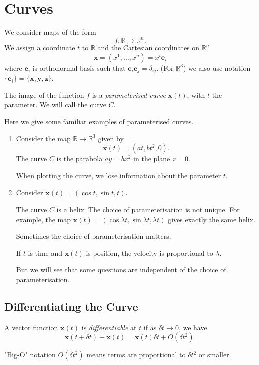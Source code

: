 \section{Curves}
We consider maps of the form
\[
    f:\mathbb{R}\to \mathbb{R}^n.
\]
We assign a coordinate \(t\) to \(\mathbb{R}\) and the Cartesian coordinates on \(\mathbb{R}^n\)
\[
    \mathbf{x} = (x^1, \ldots, x^n ) = x^i \mathbf{e}_i
\]
where \(\mathbf{e} _i\) is orthonormal basis such that \(\mathbf{e} _i \mathbf{e} _j = \delta_{ij}\). (For \(\mathbb{R}^3\)) we also use notation \(\{\mathbf{e} _i\} = \{\mathbf{x} ,\mathbf{y} ,\mathbf{z} \}\).

The image of the function \(f\) is a \textit{parameterised curve} \(\mathbf{x} (t)\), with \(t\) the parameter. We will call the curve \(C\).

\begin{eg}
    Here we give some familiar examples of parameterised curves.
    \begin{enumerate}
        \item Consider the map \(\mathbb{R}\to\mathbb{R}^3\) given by
        \[
            \mathbf{x} (t) = (at, bt^2, 0).
        \]
        The curve \(C\) is the parabola \(ay = bx^2\) in the plane \(z = 0\).
        \begin{note}
            When plotting the curve, we lose information about the parameter \(t\).
        \end{note}
        \item Consider \(\mathbf{x} (t) = (\cos t, \sin t, t)\).

        The curve \(C\) is a helix. The choice of parameterisation is not unique. For example, the map \(\mathbf{x} (t) = (\cos \lambda t,\sin \lambda t, \lambda t)\) gives exactly the same helix.

        Sometimes the choice of parameterisation matters.
        \begin{eg}
            If \(t\)  is time and \(\mathbf{x} (t)\) is position, the velocity is proportional to \(\lambda\).
        \end{eg}
        But we will see that some questions are independent of the choice of parameterisation.
    \end{enumerate}
    \subsection{Differentiating the Curve}
    A vector function \(\mathbf{x} (t)\) is \textit{differentiable} at \(t\) if as \(\delta t \to 0\), we have
    \[
        \mathbf{x} (t + \delta t) - \mathbf{x} (t) = \dot{\textbf{x} }(t)\delta t + O(\delta t^2).
    \]
    \begin{note}
        "Big-O" notation \(O(\delta t^2)\) means terms are proportional to \(\delta t^2\) or smaller.
    \end{note}


\end{eg}
